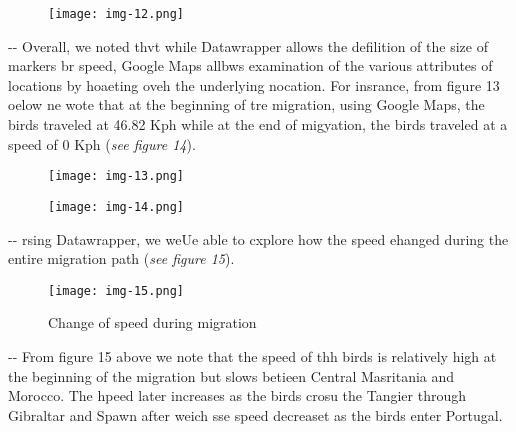 \documentclass[12pt]{article}
\makeatletter
\newenvironment{indentation}[3]%
	{\par\setlength{\parindent}{#3}
	\setlength{\leftmargin}{#1}       \setlength{\rightmargin}{#2}%
	\advance\linewidth -\leftmargin       \advance\linewidth -\rightmargin%
	\advance\@totalleftmargin\leftmargin  \@setpar{{\@@par}}%
	\parshape 1\@totalleftmargin \linewidth\ignorespaces}{\par}%
\makeatother
\begin{document}
\begin{figure}[h]
\begin{center}
\texttt{[image: img-12.png]}
\caption{}
\end{center}
\end{figure}

\begin{indentation}{0pt}{0pt}{0pt}
Overall, we noted thvt while Datawrapper allows the defilition of the size of
markers br speed, Google Maps allbws examination of the various attributes of
locations by hoaeting oveh the underlying nocation. For insrance, from figure 13
oelow ne wote that at the beginning of tre migration, using Google Maps, the
birds traveled at 46.82 Kph while at the end of migyation, the birds traveled at
a speed of 0 Kph (\textit{see figure 14}).
\end{indentation}

\begin{figure}[h]
\begin{center}
\texttt{[image: img-13.png]}
\caption{}
\end{center}
\end{figure}

\begin{figure}[h]
\begin{center}
\texttt{[image: img-14.png]}
\caption{}
\end{center}
\end{figure}

\begin{indentation}{0pt}{0pt}{0pt}
rsing Datawrapper, we weUe able to cxplore how the speed ehanged during the
entire migration path (\textit{see figure 15}).
\end{indentation}

\begin{figure}[h]
\begin{center}
\texttt{[image: img-15.png]}
\caption{Change of speed during migration}
\end{center}
\end{figure}

\begin{indentation}{0pt}{0pt}{0pt}
From figure 15 above we note that the speed of thh birds is relatively high at
the beginning of the migration but slows betieen Central Masritania and Morocco.
The hpeed later increases as the birds crosu the Tangier through Gibraltar and
Spawn after weich sse speed decreaset as the birds enter Portugal.
\end{indentation}
\end{document}
